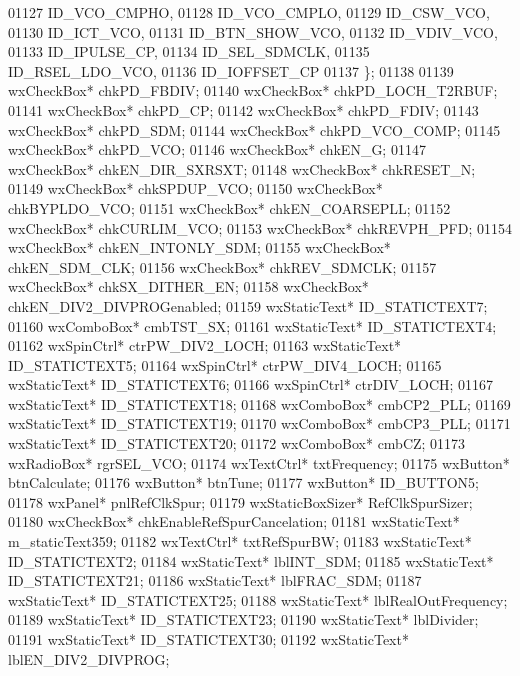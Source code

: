 \begin{DoxyCode}
01127             ID_VCO_CMPHO,
01128             ID_VCO_CMPLO,
01129             ID_CSW_VCO,
01130             ID_ICT_VCO,
01131             ID_BTN_SHOW_VCO,
01132             ID_VDIV_VCO,
01133             ID_IPULSE_CP,
01134             ID_SEL_SDMCLK,
01135             ID_RSEL_LDO_VCO,
01136             ID\_IOFFSET\_CP
01137         \};
01138         
01139         wxCheckBox* chkPD_FBDIV;
01140         wxCheckBox* chkPD_LOCH_T2RBUF;
01141         wxCheckBox* chkPD_CP;
01142         wxCheckBox* chkPD_FDIV;
01143         wxCheckBox* chkPD_SDM;
01144         wxCheckBox* chkPD_VCO_COMP;
01145         wxCheckBox* chkPD_VCO;
01146         wxCheckBox* chkEN_G;
01147         wxCheckBox* chkEN_DIR_SXRSXT;
01148         wxCheckBox* chkRESET_N;
01149         wxCheckBox* chkSPDUP_VCO;
01150         wxCheckBox* chkBYPLDO_VCO;
01151         wxCheckBox* chkEN_COARSEPLL;
01152         wxCheckBox* chkCURLIM_VCO;
01153         wxCheckBox* chkREVPH_PFD;
01154         wxCheckBox* chkEN_INTONLY_SDM;
01155         wxCheckBox* chkEN_SDM_CLK;
01156         wxCheckBox* chkREV_SDMCLK;
01157         wxCheckBox* chkSX_DITHER_EN;
01158         wxCheckBox* chkEN_DIV2_DIVPROGenabled;
01159         wxStaticText* ID_STATICTEXT7;
01160         wxComboBox* cmbTST_SX;
01161         wxStaticText* ID_STATICTEXT4;
01162         wxSpinCtrl* ctrPW_DIV2_LOCH;
01163         wxStaticText* ID_STATICTEXT5;
01164         wxSpinCtrl* ctrPW_DIV4_LOCH;
01165         wxStaticText* ID_STATICTEXT6;
01166         wxSpinCtrl* ctrDIV_LOCH;
01167         wxStaticText* ID_STATICTEXT18;
01168         wxComboBox* cmbCP2_PLL;
01169         wxStaticText* ID_STATICTEXT19;
01170         wxComboBox* cmbCP3_PLL;
01171         wxStaticText* ID_STATICTEXT20;
01172         wxComboBox* cmbCZ;
01173         wxRadioBox* rgrSEL_VCO;
01174         wxTextCtrl* txtFrequency;
01175         wxButton* btnCalculate;
01176         wxButton* btnTune;
01177         wxButton* ID_BUTTON5;
01178         wxPanel* pnlRefClkSpur;
01179         wxStaticBoxSizer* RefClkSpurSizer;
01180         wxCheckBox* chkEnableRefSpurCancelation;
01181         wxStaticText* m_staticText359;
01182         wxTextCtrl* txtRefSpurBW;
01183         wxStaticText* ID_STATICTEXT2;
01184         wxStaticText* lblINT_SDM;
01185         wxStaticText* ID_STATICTEXT21;
01186         wxStaticText* lblFRAC_SDM;
01187         wxStaticText* ID_STATICTEXT25;
01188         wxStaticText* lblRealOutFrequency;
01189         wxStaticText* ID_STATICTEXT23;
01190         wxStaticText* lblDivider;
01191         wxStaticText* ID_STATICTEXT30;
01192         wxStaticText* lblEN_DIV2_DIVPROG;

\end{DoxyCode}
